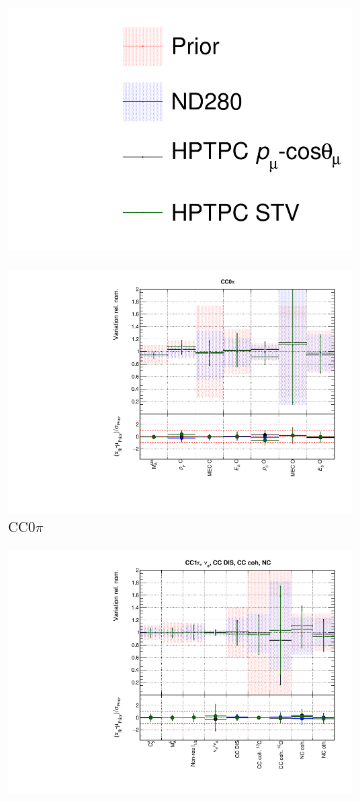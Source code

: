 \begin{figure}
\centering
\begin{subfigure}{0.95\textwidth}
  \centering
  \includegraphics[width=0.25\linewidth]{figs/hptpcfits_leg}	
\end{subfigure}
\begin{subfigure}{0.49\textwidth}
  \centering
  \includegraphics[width=0.95\linewidth]{figs/hptpcfitsxsec_1}
  \caption{CC0$\pi$}
\end{subfigure}
\begin{subfigure}{0.49\textwidth}
  \centering
  \includegraphics[width=0.95\linewidth]{figs/hptpcfitsxsec_2}

\end{subfigure}
\end{figure}
